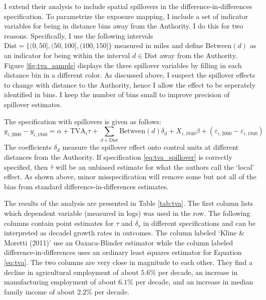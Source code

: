 \documentclass[11pt]{article}
\begin{document}
I extend their analysis to include spatial spillovers in the difference-in-differences specification. To parametrize the exposure mapping, I include a set of indicator variables for being in distance bins away from the Authority. I do this for two reasons. Specifically, I use the following intervals $\text{Dist} = \{(0, 50], (50, 100], (100, 150]\}$ measured in miles and define $\text{Between}(d)$ as an indicator for being within the interval $d \in \text{Dist}$ away from the Authority. Figure \ref{fig:tva_sample} displays the three spillover variables by filling in each distance bin in a different color. As discussed above, I suspect the spillover effects to change with distance to the Authority, hence I allow the effect to be seperately identified in bins. I keep the number of bins small to improve precision of spillover estimates. 

The specification with spillovers is given as follows:  
\begin{equation}\label{eq:tva_spillover}
    y_{i, 2000} - y_{i, 1940} = \alpha + \text{TVA}_i \tau + \sum_{d \in \text{Dist}} \text{Between}(d)\delta_d + X_{i, 1940} \beta + (\varepsilon_{i, 2000} - \varepsilon_{i, 1940})
\end{equation} 
The coefficients $\delta_d$ measure the spillover effect onto control units at different distances from the Authority. If specification \ref{eq:tva_spillover} is correctly specified, then $\hat{\tau}$ will be an unbiased estimate for what the authors call the `local' effect. As shown above, minor misspecification will remove some but not all of the bias from standard difference-in-differences estimates. 

The results of the analysis are presented in Table \ref{tab:tva}. The first column lists which dependent variable (measured in logs) was used in the row. The following columns contain point estimates for $\tau$ and $\delta_s$ in different specifications and can be interpreted as decadel growth rates in outcomes. The column labeled `Kline \& Moretti (2011)' use an Oaxaca-Blinder estimator while the column labeled difference-in-differences uses an ordinary least squares estimator for Equation \ref{eq:tva}. The two columns are very close in magnitude to each other. They find a decline in agricultural employment of about $5.6\%$ per decade, an increase in manufacturing employment of about $6.1\%$ per decade, and an increase in median family income of about $2.2\%$ per decade. 
\end{document}
